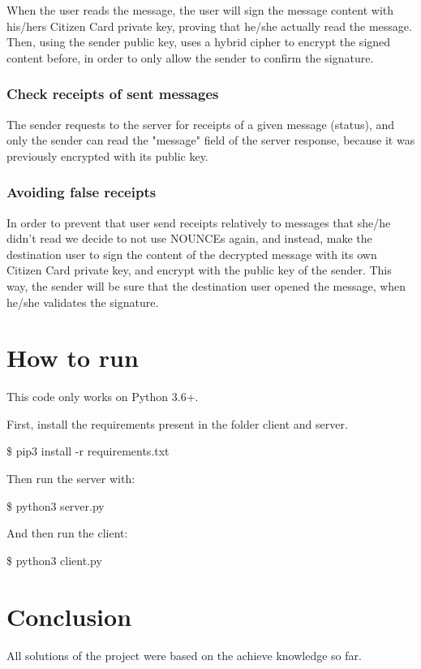 \documentclass[pdftex,12pt,a4paper]{report}
\begin{document}
When the user reads the message, the user will sign the message content with his/hers Citizen Card private key, proving that he/she actually read the message. Then, using the sender public key, uses a hybrid cipher to encrypt the signed content before, in order to only allow the sender to confirm the signature.

\subsubsection{Check receipts of sent messages}

The sender requests to the server for receipts of a given message (status), and only the sender can read the "message" field of the server response, because it was previously encrypted with its public key.

\subsubsection{Avoiding false receipts}

In order to prevent that user send receipts relatively to messages that she/he didn't read we decide to not use NOUNCEs again, and instead, make the destination user to sign the content of the decrypted message with its own Citizen Card private key, and encrypt with the public key of the sender. This way, the sender will be sure that the destination user opened the message, when he/she validates the signature.

\section{How to run}

This code only works on Python 3.6+.

First, install the requirements present in the folder client and server. 

\$ pip3 install -r requirements.txt

Then run the server with:

\$ python3 server.py

And then run the client:

\$ python3 client.py

\section{Conclusion}

All solutions of the project were based on the achieve knowledge so far.
\end{document}
